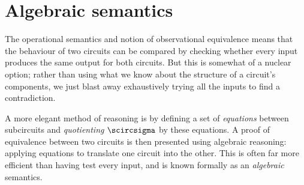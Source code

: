 \chapter{Algebraic semantics}\label{chap:algebraic}

The operational semantics and notion of observational equivalence means that the
behaviour of two circuits can be compared by checking
whether every input produces the same output for both circuits.
But this is somewhat of a nuclear option; rather than using what we know
about the structure of a circuit's components, we just blast away
exhaustively trying all the inputs to find a contradiction.

A more elegant method of reasoning is by defining a set of \emph{equations}
between subcircuits and \emph{quotienting} \(\scircsigma\) by these equations.
A proof of equivalence between two circuits is then presented using algebraic
reasoning: applying equations to translate one circuit into the other.
This is often far more efficient than having test every input, and is
known formally as an \emph{algebraic} semantics.

